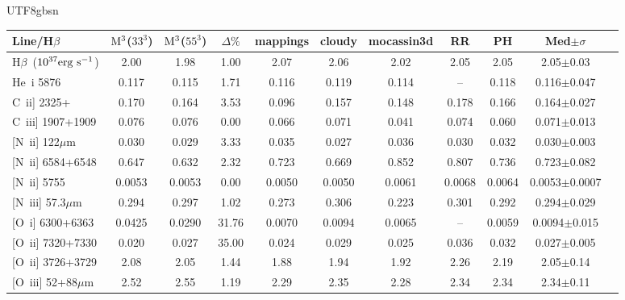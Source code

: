 \documentclass[twocolumn]{aastex62}
\newcommand{\hb}{H$\beta$}    %
\newcommand{\newcode}{{$\rm M^3$}}
\begin{document}
\begin{CJK*}{UTF8}{gbsn}
\begin{table*}
\begin{center}
\caption{Meudon/Lexington H~{\sc ii} Region Benchmark Results: HII40.}
\begin{minipage}{13.5cm}
\label{tab:HII40}
\begin{tabular}{@{}lcccccccccc}
\hline
Line/\hb & \newcode ($33^3$) & \newcode ($55^3$) & $\Delta\%$ & {\sc mappings} & {\sc cloudy} & {\sc mocassin3d} & RR & PH & Med$\pm\sigma$   \\
\hline
\hb\ ($\rm 10^{37}erg~s^{-1}$) & 2.00  & 1.98    & 1.00    & 2.07     & 2.06     & 2.02     & 2.05     & 2.05   & 2.05$\pm$0.03 \\
He~{\sc i} 5876                        & 0.117 & 0.115  &  1.71    & 0.116   & 0.119    & 0.114   & --         & 0.118 & 0.116$\pm$0.047 \\
C~{\sc ii]} 2325+                      & 0.170 & 0.164  &  3.53   & 0.096   & 0.157   & 0.148   & 0.178   & 0.166 & 0.164$\pm$0.027 \\
C~{\sc iii]} 1907+1909             & 0.076 & 0.076  &  0.00   & 0.066   & 0.071   & 0.041   & 0.074   & 0.060  & 0.071$\pm$0.013\\
{[N~\sc ii]} 122$\mu$m            & 0.030 & 0.029  &  3.33  & 0.035   & 0.027   & 0.036   & 0.030   & 0.032   &0.030$\pm$0.003\\
{[N~\sc ii]} 6584+6548             & 0.647 & 0.632  &  2.32   & 0.723   & 0.669   & 0.852   & 0.807   & 0.736  &0.723$\pm$0.082\\
{[N~\sc ii]} 5755                       & 0.0053 & 0.0053 &  0.00     & 0.0050 & 0.0050 & 0.0061 & 0.0068 & 0.0064  & 0.0053$\pm$0.0007\\
{[N~\sc iii]} 57.3$\mu$m          & 0.294   & 0.297   &  1.02   & 0.273   & 0.306   & 0.223   & 0.301   & 0.292       &0.294$\pm$0.029\\
{[O~\sc i]} 6300+6363             & 0.0425 & 0.0290 &  31.76   & 0.0070 & 0.0094 & 0.0065  & --   & 0.0059  &  0.0094$\pm$0.015\\
{[O~\sc ii]} 7320+7330            & 0.020   & 0.027   &  35.00   & 0.024    & 0.029   & 0.025   & 0.036   & 0.032  &0.027$\pm$0.005\\
{[O~\sc ii]} 3726+3729            & 2.08     & 2.05     &  1.44   & 1.88      & 1.94     & 1.92     & 2.26     & 2.19  & 2.05$\pm$0.14\\
{[O~\sc iii]} 52+88$\mu$m      & 2.52     & 2.55     &  1.19   & 2.29      & 2.35     & 2.28     & 2.34     & 2.34  & 2.34$\pm$0.11\\

\end{tabular}
\end{minipage}
\end{center}
\end{table*}
\end{CJK*}
\end{document}
